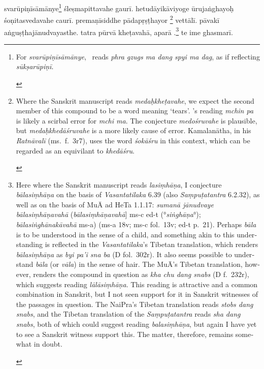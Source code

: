\documentclass[naipra.tex]{subfiles}
\begin{document}
\begin{sanskrit}
\pstart
svarūpiṇīsāmānye\footnote{
	\begin{english}%
		For \emph{svarūpiṇīsāmānye}, \TIB\ reads \emph{phra gzugs ma dang spyi ma dag}, as if reflecting \emph{sūkṣarūpiṇī}.
	\end{english}
}  śleṣmapittavahe gaurī. 
hetudāyikāviyoge ūrujaṅghayoḥ śoṇitasvedavahe caurī. 
premaṇīsiddhe pādapṛṣṭhayor \footnote{
	\begin{english}%
		Where the Sanskrit manuscript reads \emph{medaḥkheṭavahe}, we expect the second member of this compound to be a word meaning `tears'.
		\TIB 's reading \emph{mchin pa} is likely a scirbal error for \emph{mchi ma}.
		The conjecture \emph{medośruvahe} is plausible, but \emph{medaḥkhedāśruvahe} is a more likely cause of error. 
		Kamalanātha, in his \emph{Ratnāvalī} (ms.\ f.\ 3r7), uses the word \emph{śokāśru} in this context, which can be regarded as an equivilant to \emph{khedāśru}.
	\end{english}
} vettālī. 
pāvakī aṅguṣṭhajānudvayasthe.
tatra pūrvā kheṭavahā, aparā .\footnote{
	\begin{english}%
		Here where the Sanskrit manuscript reads \emph{lasiṃhāṇa}, I conjecture \emph{bālasiṃhāṇa} on the basis of \emph{Vasantatilaka} 6.39 (also \emph{Saṃpuṭatantra} 6.2.32), as well as on the basis of MuĀ ad HeTa 1.1.17: \emph{sumanā jānudvaye bālasiṃhāṇavahā} (\emph{bālasiṃhāṇavahā}] ms-c ed-t (°\emph{siṅghāṇa}°); \emph{bālasiṅghānakāvahā} ms-a) (ms-a 18v; ms-c fol.\ 13v; ed-t p.\ 21).
		Perhaps \emph{bāla} is to be understood in the sense of a child, and something akin to this understanding is reflected in the \emph{Vasantatilaka}'s Tibetan translation, which renders \emph{bālasiṃhāṇa} as \emph{byi pa'i sna ba} (D fol.\ 302r).
		It also seems possible to understand \emph{bāla} (or \emph{vāla}) in the sense of hair.
		The MuĀ's Tibetan translation, however, renders the compound in question as \emph{kha chu dang snabs} (D f.\ 232r), which suggests reading \emph{lālāsiṃhāṇa}.
		This reading is attractive and a common combination in Sanskrit, but I not seen support for it in Sanskrit witnesses of the passages in question.
		The NaiPra's Tibetan translation reads \emph{stobs dang snabs}, and the Tibetan translation of the \emph{Saṃpuṭatantra} reads \emph{sha dang snabs}, both of which could suggest reading \emph{balasiṃhāṇa}, but again I have yet to see a Sanskrit witness support this.
		The matter, therefore, remains somewhat in doubt.
	\end{english}
}
te ime ghasmarī. 
\pend


\end{sanskrit}
\end{document}
